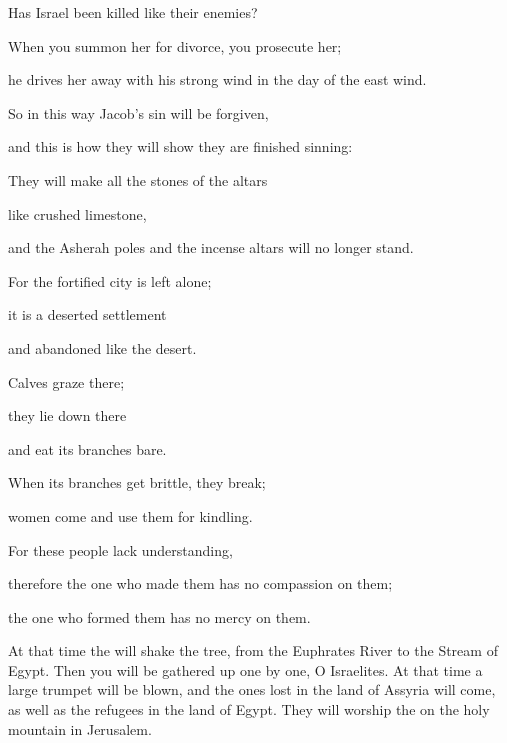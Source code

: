 {\par }{\Q Has Israel been killed
like their enemies?
\par }{\Q {}When you summon
her for divorce,
you prosecute
her;

\par }{\Q he drives her away
with
his strong
wind
in the day
of the east
wind.
\par }{\Q {}So
in this
way Jacob’s
sin
will be forgiven,
\par }{\Q and this
is how they
will show they are finished
sinning:

\par }{\Q They will make
all
the stones
of the altars
\par }{\Q like crushed
limestone,
\par }{\Q and the Asherah poles
and the incense altars
will no
longer stand.
\par }{\Q {}For
the fortified
city
is left
alone;
\par }{\Q it is a deserted settlement
\par }{\Q and abandoned
like the desert.
\par }{\Q Calves
graze
there;
\par }{\Q they lie
down there
\par }{\Q and eat its branches
bare.
\par }{\Q {}When its branches
get brittle,
they break;
\par }{\Q women
come
and use them for kindling.
\par }{\Q For
these people
lack understanding,
\par }{\Q therefore
the one who made
them has no
compassion
on them;
\par }{\Q the one who formed
them has no
mercy on them.
\par }{\PP {}At that time
the
{}
will shake
the tree,
from the Euphrates
River to
the Stream
of Egypt.
Then you
will be gathered
up one
by one,
O Israelites.
At that
time
a large
trumpet
will be blown,
and the ones lost
in the land
of Assyria
will come,
as well as the refugees
in the land
of Egypt.
They will worship
the {}
on the holy
mountain
in Jerusalem.

\par }
